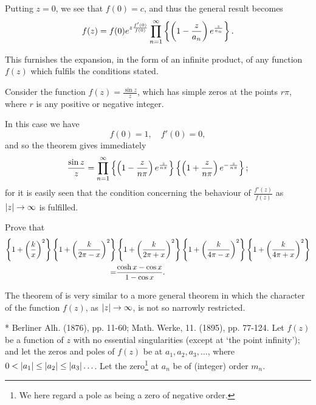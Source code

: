 Putting $z = 0$, we see that $f(0) = c$, and thus the general result
becomes
$$
f(z)
=
f(0)
e^{ z \frac{f'(0)}{f(0)} }
\prod_{n=1}^{\infty}
\left\{ 
  \left(  1 - \frac{z}{a_{n}}  \right)
  e^{ \frac{z}{a_{n}} }
 \right\}.
$$

This furnishes the expansion, in the form of an infinite product, of
any function $f(z)$ which fulfils the conditions stated.
\begin{wandwexample}
  Consider the function
  $f(z) = \frac{\sin z}{z}$, which has simple zeros at
  the points $r \pi$, where $r$ is any positive or negative integer.

  In this case we have
  $$
  f(0) = 1,
  \quad
  f'(0) = 0,
  $$
  and so the theorem gives immediately
  $$
  \frac{\sin z}{z}
  =
  \prod_{n=1}^{\infty}
  \left\{ 
    \left( 1 - \frac{z}{n \pi} \right)
    e^{ \frac{z}{n \pi} }
   \right\}
  \left\{ 
    \left( 1 + \frac{z}{n \pi} \right)
    e^{ -\frac{z}{n \pi} }
   \right\};
  $$
  for it is easily seen that the condition concerning the behaviour of
  $\frac{f'(z)}{f(z)}$ as $\left| z \right| \rightarrow \infty$ is fulfilled.
\end{wandwexample}
\begin{wandwexample}
  Prove that
  \begin{align*}
  \left\{ 
    1 + \left(  \frac{k}{x}   \right)^{2}
   \right\}
  \left\{ 
    1 + \left(  \frac{k}{2\pi - x}   \right)^{2}
   \right\}
  &
  \left\{ 
    1 + \left(  \frac{k}{2\pi + x}   \right)^{2}
   \right\}
  \left\{ 
    1 + \left(  \frac{k}{4\pi - x}   \right)^{2}
   \right\}
  \left\{ 
    1 + \left(  \frac{k}{4\pi + x}   \right)^{2}
   \right\}
  \\
  =&
  \frac{\cosh x - \cos x}{1-\cos x}.
  \end{align*}
\end{wandwexample}

The theorem of is very similar to a more general theorem in
which the character of the function $f(z)$, as
$\left| z \right| \rightarrow \infty$, is not so
narrowly restricted.

* Berliner Alh. (1876), pp. 11-60; Math. Werke, 11. (1895), pp.
77-124.
%
%
Let $f(z)$ be a function of $z$ with no essential singularities (except at
`the point infinity'); and let the zeros and poles of $f(z)$ be at 
$a_{1}, a_{2}, a_{3}, \ldots$, where
$0 < \left| a_{1} \right| \leq \left| a_{2} \right| \leq \left| a_{3} \right| \ldots$.
Let the zero\footnote{We here regard a pole as being a zero of
  negative order.} at $a_{n}$ be of (integer) order $m_{n}$.


